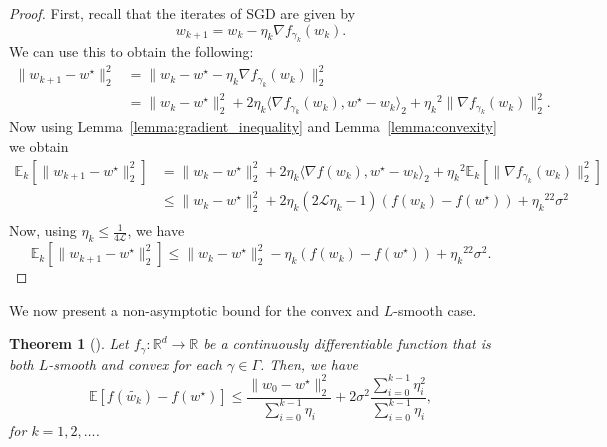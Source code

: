\documentclass[12pt]{article}
\newtheorem{theorem}{Theorem}[section]
\theoremstyle{definition}
\numberwithin{equation}{section}
\newcommand{\R}{\mathbb{R}}
\newcommand{\E}{\mathbb{E}}
\newcommand{\CL}{\mathcal{L}}
\newcommand{\ev}[1]{\mathbb{E}\left[{#1}\right]}
\newcommand{\norm}[1]{\lVert{#1}\rVert_2}
\newcommand{\scp}[2]{\langle{#1}, {#2}\rangle_2}
\begin{document}
\begin{proof}
  First, recall that the iterates of SGD are given by
  \begin{equation*}
    w_{k+1} = w_{k} - \eta_k \nabla f_{\gamma_k}(w_{k}).
  \end{equation*}
  We can use this to obtain the following:
  \begin{align*}
    \norm{w_{k+1} - w^\star}^2 &= \norm{w_{k} - w^\star - \eta_k \nabla f_{\gamma_k}(w_{k})}^2 \\
    &= \norm{w_{k} - w^\star}^2 + 2 \eta_k \scp{\nabla f_{\gamma_k}(w_{k})}{ w^\star - w_{k}} + {\eta_k}^2\norm{\nabla f_{\gamma_k}(w_{k})}^2.
  \end{align*}
  Now using Lemma~\ref{lemma:gradient_inequality} and Lemma~\ref{lemma:convexity} we obtain
  \begin{align*}
    \E_k[\norm{w_{k+1} - w^\star}^2] &= \norm{w_{k} - w^\star}^2 + 2 \eta_k \scp{\nabla f(w_{k})}{w^\star - w_{k}}+ {\eta_k}^2\E_k[\norm{\nabla f_{\gamma_k}(w_{k})}^2] \\
    &\leq \norm{w_{k} - w^\star}^2 + 2 \eta_k(2\CL \eta_k - 1)(f(w_{k}) - f(w^\star))+ {\eta_k}^22\sigma^2 \\
  \end{align*}
  Now, using $\eta_k \leq \frac{1}{4 \CL}$, we have
  \begin{equation*}
    \E_k[\norm{w_{k+1} - w^\star}^2] \leq \norm{w_{k} - w^\star}^2 - \eta_k(f(w_{k}) - f(w^\star))+ {\eta_k}^22\sigma^2.
  \end{equation*}
\end{proof}
We now present a non-asymptotic bound for the convex and $L$-smooth case.
\begin{theorem}[]
  \label{thm:SGD_bound}
  Let $f_{\gamma} : \R^d \rightarrow \R$ be a continuously differentiable function that is both $L$-smooth and convex for each $\gamma \in \Gamma$. Then, we have
  \begin{equation*}
    \ev{f(\widetilde{w_{k}}) - f(w^\star)} \leq \frac{\norm{w_{0} - w^\star}^2}{\sum_{i=0}^{k-1}\eta_i} + 2 \sigma^2 \frac{\sum_{i=0}^{k-1}\eta_i^2}{\sum_{i=0}^{k-1}\eta_i},
  \end{equation*}
  for $k = 1, 2, \dots$.
\end{theorem}
\end{document}
